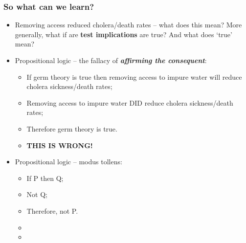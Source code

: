 \documentclass[aspectratio=169]{beamer}
\theoremstyle{principle}
\begin{document}
\begin{frame}
\frametitle{So what can we learn?}
\begin{itemize}
\item Removing access reduced cholera/death rates -- what does this mean?  More generally, what if are \textbf{test implications} are true?  And what does `true' mean?
\bigskip
\item Propositional logic -- the fallacy of \textit{\textbf{affirming the consequent}}:
\begin{itemize}
\item If germ theory is true then removing access to impure water will reduce cholera sickness/death rates;
\item Removing access to impure water DID reduce cholera sickness/death rates;
\item Therefore germ theory is true.
\item \textbf{THIS IS WRONG!}
\end{itemize}
\bigskip
\item[]  \color{white}Propositional logic -- modus tollens:
\begin{itemize}
\item[] \color{white}If P then Q;
\item[] \color{white}Not Q;
\item[] \color{white}Therefore, not P.
\item[]
\item[]
 \end{itemize}
\end{itemize}

\end{frame}
\end{document}
